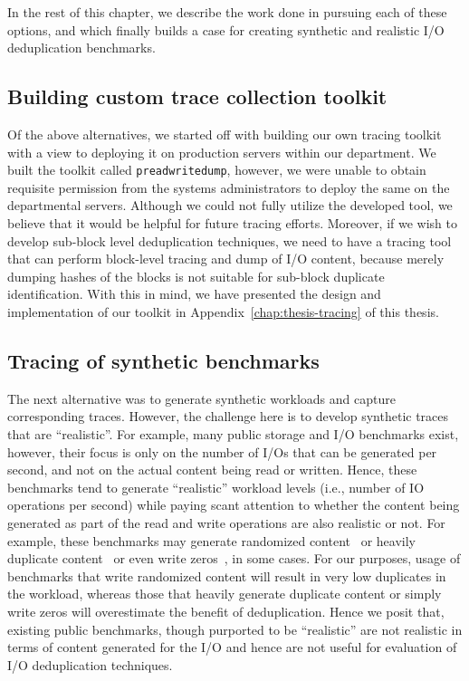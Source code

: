 In the rest of this chapter, we describe the work done 
in pursuing each of these options, and which finally 
builds a case for creating synthetic and realistic
I/O deduplication benchmarks.

\subsection{Building custom trace collection toolkit}
Of the above alternatives, we started off with building our own tracing 
toolkit with a view to deploying it on production servers within our
department. We built the toolkit called \texttt{preadwritedump}, however, 
we were unable to obtain requisite permission from the systems 
administrators to deploy the same on the departmental servers. Although
we could not fully utilize the developed tool, we believe that it would
be helpful for future tracing efforts. Moreover, if we wish to develop
sub-block level deduplication techniques, we need to have a tracing tool
that can perform block-level tracing and dump of I/O content, because 
merely dumping hashes of the blocks is not suitable for sub-block duplicate
identification. With this in mind, we have presented the design and 
implementation of our toolkit in Appendix~\ref{chap:thesis-tracing}
of this thesis.

\subsection{Tracing of synthetic benchmarks}
The next alternative was to generate 
synthetic workloads and capture corresponding 
traces. However,
the challenge here is to develop synthetic traces that are ``realistic''. 
For example, many public storage and I/O benchmarks exist, however, their 
focus is only on the number of I/Os that can be
generated per second, and not on the actual content being read or written. 
Hence, these benchmarks tend to generate ``realistic'' workload levels (i.e., number of IO 
operations per second) while paying scant attention to
whether the content being generated as part of the read and write 
operations are also realistic or not.
For example, these benchmarks may generate randomized content~\cite{postmark}
or heavily duplicate content~\cite{rubis}
or even write zeros~\cite{zeros}, in some cases. 
For our purposes, usage of benchmarks that write randomized content
will result in very low duplicates in the workload, whereas those that heavily 
generate duplicate content or simply write zeros will overestimate the benefit of deduplication.
Hence we posit that, existing public benchmarks, though purported 
to be ``realistic'' are not realistic in terms of content generated
for the I/O and hence are not useful for evaluation of I/O deduplication techniques.

